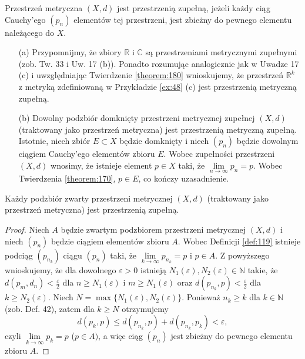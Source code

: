 \documentclass[leqno]{article}
\begin{document}
\begin{justify}
\begin{defn}
    Przestrzeń metryczna $(X, d)$ jest przestrzenią zupełną, jeżeli każdy ciąg Cauchy'ego $(p_n)$ elementów
    tej przestrzeni, jest zbieżny do pewnego elementu należącego do $X$.
\end{defn}

\begin{uwaga}
    \begin{itemize}
        \item [(a)]
            Przypomnijmy, że zbiory $\mathbb{R}$ i $\mathbb{C}$ są przestrzeniami metrycznymi zupełnymi
            (zob. Tw. 33 i Uw. 17 (b)). Ponadto rozumując analogicznie jak w Uwadze 17 (c) i uwzględniając Twierdzenie \ref{theorem:180}
            wnioskujemy, że przestrzeń $\mathbb{R}^k$ z metryką zdefiniowaną w Przykładzie \ref{ex:48} (c) 
            jest przestrzenią metryczną zupełną.
        \item [(b)]
            Dowolny podzbiór domknięty przestrzeni metrycznej zupełnej $(X, d)$ (traktowany jako przestrzeń metryczna)
            jest przestrzenią metryczną zupełną. Istotnie, niech zbiór $E \subset X$ będzie domknięty i niech $(p_n)$ będzie dowolnym
            ciągiem Cauchy'ego elementów zbioru $E$. Wobec zupełności przestrzeni $(X, d)$
            wnosimy, że istnieje element $p \in X$ taki, że $\lim\limits_{n \to \infty}p_n = p$.
            Wobec Twierdzenia \ref{theorem:170}, $p \in E$, co kończy uzasadnienie.
    \end{itemize}
\end{uwaga}

\begin{theorem}
{
    Każdy podzbiór zwarty przestrzeni metrycznej $(X, d)$ (traktowany jako przestrzeń metryczna)
    jest przestrzenią zupełną.
}
\end{theorem}

\begin{proof}
    Niech $A$ będzie zwartym podzbiorem przestrzeni metrycznej $(X, d)$ i niech $(p_n)$ będzie ciągiem
    elementów zbioru $A$. Wobec Definicji \ref{def:119} istnieje podciąg $(p_{n_k})$ 
    ciągu $(p_n)$ taki, że $\lim\limits_{k \to \infty}p_{n_k} = p$ i $p \in A$.
    Z powyższego wnioskujemy, że dla dowolnego $\varepsilon > 0$ istnieją $N_1(\varepsilon), N_2(\varepsilon) \in \mathbb{N}$
    takie, że $d(p_m, d_n) < \frac{\varepsilon}{2}$ dla $n \geqslant N_1(\varepsilon)$ i $m \geqslant N_1(\varepsilon)$ 
    oraz $d(p_{n_k}, p) < \frac{\varepsilon}{2}$ dla $k \geqslant N_2(\varepsilon)$. 
    Niech $N = \max\{N_1(\varepsilon), N_2(\varepsilon)\}$. Ponieważ $n_k \geqslant k$ dla $k \in \mathbb{N}$ (zob. Def. 42), zatem
    dla $k \geqslant N$ otrzymujemy 
    \[
        d(p_k, p) \leqslant d(p_{n_k}, p) + d(p_{n_k}, p_k) < \varepsilon,
    \]
    czyli $\lim\limits_{k \to \infty}p_k = p$ ($p \in A)$, a więc ciąg $(p_n)$ jest zbieżny do pewnego
    elementu zbioru $A$.
\end{proof}


\end{justify}
\end{document}
